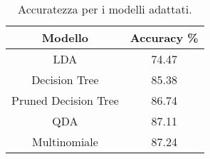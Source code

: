 \begin{table}[H]
\centering\caption{Accuratezza per i modelli adattati.}
\begin{tabular}{cc}
\toprule
              Modello &  Accuracy \% \\
\midrule
                  LDA &       74.47 \\
        Decision Tree &       85.38 \\
 Pruned Decision Tree &       86.74 \\
                  QDA &       87.11 \\
         Multinomiale &       87.24 \\
\bottomrule
\end{tabular}
\end{table}